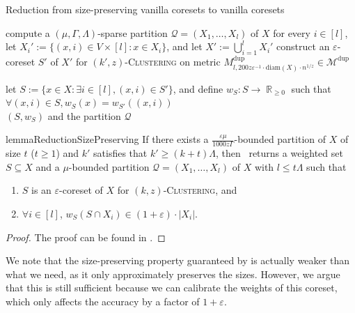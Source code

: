 \documentclass[letterpaper,11pt]{article}
\theoremstyle{plain}
\theoremstyle{definition}
\theoremstyle{remark}
\DeclareMathOperator{\R}{\mathbb{R}}
\newcommand{\diam}{\mathrm{diam}}
\newcommand{\dup}{\mathrm{dup}}
\newcommand{\eps}{\varepsilon}
\newcommand{\calM}{\mathcal{M}}
\newcommand{\calQ}{\mathcal{Q}}
\newcommand{\ProblemName}[1]{\textsc{#1}}
\newcommand{\kzC}{\ProblemName{$(k,z)$-Clustering}\xspace}
\newcommand{\tzC}[1]{\ProblemName{$(#1,z)$-Clustering}\xspace}
\begin{document}
\begin{algorithm}[ht]
    \caption{Reduction from size-preserving vanilla coresets to vanilla coresets}
    \label{alg:size-preserving}
    \begin{algorithmic}[1]
        \State compute a $(\mu,\Gamma,\Lambda)$-sparse partition $\calQ=(X_1,\dots,X_l)$ of $X$ \label{alg line:sparse partition} 
        \State for every $i\in [l]$, let $X_i':=\{(x,i)\in V\times [l]: x\in X_i\}$, and let $X':=\bigcup_{i=1}^l X_i'$
        \label{alg line:mapping}
        \State construct an $\eps$-coreset $S'$ of $X'$ for \tzC{k'} on metric $M^\dup_{l,200z\eps^{-1}\cdot \diam(X)\cdot n^{1/z}}\in \calM^\dup$ \label{alg line:vanilla coreset}


        \State let $S:=\{x\in X: \exists i\in[l], (x,i)\in S'\}$, and define $w_S:S\to\R_{\ge 0}$ such that 
        $
            \forall (x,i)\in S, w_S(x) = w_{S'}((x,i))
        $
        \label{alg line:preimage}
        \\
        \Return $(S,w_S)$ and the partition $\calQ$
    \end{algorithmic}
\end{algorithm}
\begin{restatable}{lemma}{ReductionSizePreserving}
    \label{lem:size-preserving}
    If there exists a $\frac{\eps\mu}{1000z\Gamma}$-bounded partition of $X$ of size $t$ ($t\ge 1$) and $k'$ satisfies that $k' \ge (k+t)\Lambda$, then~ returns a weighted set $S\subseteq X$ and a $\mu$-bounded partition $\calQ = (X_1,\dots,X_l)$ of $X$ with $l\le t\Lambda$ such that
    \begin{enumerate}
        \item $S$ is an $\eps$-coreset of $X$ for \kzC, and
        \item $\forall i\in [l]$, $w_S(S\cap X_i)\in (1+\eps)\cdot |X_i|$.
    \end{enumerate}
\end{restatable}
\begin{proof}
    The proof can be found in .
\end{proof}


We note that the size-preserving property guaranteed by  is actually weaker than what we need, as it only approximately preserves the sizes. However, we argue that this is still sufficient because we can calibrate the weights of this coreset, which only affects the accuracy by a factor of $1+\eps$.
\end{document}
